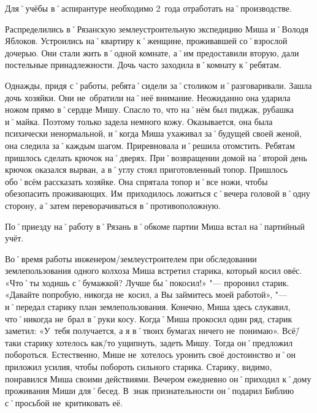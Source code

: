 Для˚учёбы в˚аспирантуре необходимо 2~года отработать на˚производстве.

Распределились в˚Рязанскую землеустроительную экспедицию Миша и˚Володя Яблоков. Устроились на˚квартиру к˚женщине, проживавшей со˚взрослой дочерью. Они стали жить в˚одной комнате, а˚им предоставили вторую, дали постельные принадлежности. Дочь часто заходила в˚комнату к˚ребятам.

Однажды, придя с˚работы, ребята˚сидели за˚столиком и˚разговаривали. Зашла дочь хозяйки. Они не~обратили на˚неё внимание. Неожиданно она ударила ножом прямо в˚сердце Мишу. Спасло то, что на˚нём был пиджак, рубашка и˚майка. Поэтому только задела немного кожу. Оказывается, она была психически ненормальной, и˚когда Миша ухаживал за˚будущей своей женой, она следила за˚каждым шагом. Приревновала и˚решила отомстить. Ребятам пришлось сделать крючок на˚дверях. При˚возвращении домой на˚второй день крючок оказался  вырван, а в˚углу стоял приготовленный топор. Пришлось обо˚всём рассказать хозяйке. Она спрятала топор и˚все ножи, чтобы обезопасить проживающих. Им~приходилось ложиться с˚вечера головой в˚одну сторону, а˚затем переворачиваться в˚противоположную.

По˚приезду на˚работу в˚Рязань в˚обкоме партии Миша встал на˚партийный учёт.

Во˚время работы инженером\-/землеустроителем при обследовании землепользования одного колхоза Миша встретил старика, который косил овёс. «Что˚ты ходишь с˚бумажкой? Лучше бы˚покосил!» "--- проронил старик. «Давайте попробую, никогда не~косил, а Вы займитесь моей работой», "--- и˚передал старику план землепользования. Конечно, Миша здесь слукавил, что˚никогда не~брал в˚руки косу. Когда˚Миша прокосил один ряд, старик заметил: «У~тебя получается, а я в˚твоих бумагах ничего не~понимаю». Всё\=/таки старику хотелось как\=/то ущипнуть, задеть Мишу. Тогда он˚предложил побороться. Естественно, Мише не~хотелось уронить своё достоинство и˚он приложил усилия, чтобы побороть сильного старика. Старику, видимо, понравился Миша своими действиями. Вечером ежедневно он˚приходил к˚дому проживания Миши для˚бесед. В~знак признательности он˚подарил Библию с˚просьбой не~критиковать её.

